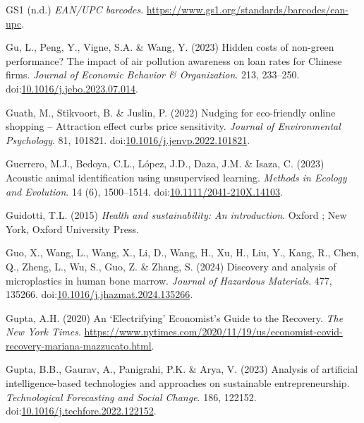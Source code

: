 \documentclass[
  letterpaper,
  DIV=11,
  numbers=noendperiod]{scrartcl}
\newlength{\cslhangindent}
\newenvironment{CSLReferences}[2] %
 {\begin{list}{}{%
  \setlength{\itemindent}{0pt}
  \setlength{\leftmargin}{0pt}
  \setlength{\parsep}{0pt}
  \ifodd #1
   \setlength{\leftmargin}{\cslhangindent}
   \setlength{\itemindent}{-1\cslhangindent}
  \fi
  \setlength{\itemsep}{#2\baselineskip}}}
 {\end{list}}
\begin{document}
\begin{CSLReferences}{0}{1}
GS1 (n.d.) \emph{{EAN}/{UPC} barcodes}.
\url{https://www.gs1.org/standards/barcodes/ean-upc}.

Gu, L., Peng, Y., Vigne, S.A. \& Wang, Y. (2023) Hidden costs of
non-green performance? {The} impact of air pollution awareness on loan
rates for {Chinese} firms. \emph{Journal of Economic Behavior \&
Organization}. 213, 233--250.
doi:\href{https://doi.org/10.1016/j.jebo.2023.07.014}{10.1016/j.jebo.2023.07.014}.

Guath, M., Stikvoort, B. \& Juslin, P. (2022) Nudging for eco-friendly
online shopping -- {Attraction} effect curbs price sensitivity.
\emph{Journal of Environmental Psychology}. 81, 101821.
doi:\href{https://doi.org/10.1016/j.jenvp.2022.101821}{10.1016/j.jenvp.2022.101821}.

Guerrero, M.J., Bedoya, C.L., López, J.D., Daza, J.M. \& Isaza, C.
(2023) Acoustic animal identification using unsupervised learning.
\emph{Methods in Ecology and Evolution}. 14 (6), 1500--1514.
doi:\href{https://doi.org/10.1111/2041-210X.14103}{10.1111/2041-210X.14103}.

Guidotti, T.L. (2015) \emph{Health and sustainability: An introduction}.
Oxford ; New York, Oxford University Press.

Guo, X., Wang, L., Wang, X., Li, D., Wang, H., Xu, H., Liu, Y., Kang,
R., Chen, Q., Zheng, L., Wu, S., Guo, Z. \& Zhang, S. (2024) Discovery
and analysis of microplastics in human bone marrow. \emph{Journal of
Hazardous Materials}. 477, 135266.
doi:\href{https://doi.org/10.1016/j.jhazmat.2024.135266}{10.1016/j.jhazmat.2024.135266}.

Gupta, A.H. (2020) An {`{Electrifying}'} {Economist}'s {Guide} to the
{Recovery}. \emph{The New York Times}.
\url{https://www.nytimes.com/2020/11/19/us/economist-covid-recovery-mariana-mazzucato.html}.

Gupta, B.B., Gaurav, A., Panigrahi, P.K. \& Arya, V. (2023) Analysis of
artificial intelligence-based technologies and approaches on sustainable
entrepreneurship. \emph{Technological Forecasting and Social Change}.
186, 122152.
doi:\href{https://doi.org/10.1016/j.techfore.2022.122152}{10.1016/j.techfore.2022.122152}.


\end{CSLReferences}
\end{document}
